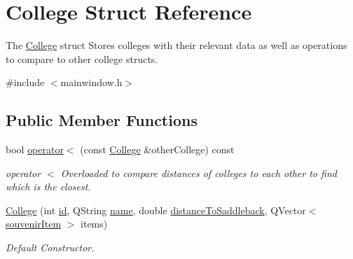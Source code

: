 \hypertarget{struct_college}{}\section{College Struct Reference}
\label{struct_college}


The \mbox{\hyperlink{struct_college}{College}} struct Stores colleges with their relevant data as well as operations to compare to other college structs.  




{\ttfamily \#include $<$mainwindow.\+h$>$}

\subsection*{Public Member Functions}
\begin{DoxyCompactItemize}
\item 
bool \mbox{\hyperlink{struct_college_a6cdcaec6e39c48a6f42f4e908aa04d95}{operator$<$}} (const \mbox{\hyperlink{struct_college}{College}} \&other\+College) const
\begin{DoxyCompactList}\small\item\em operator $<$ Overloaded to compare distances of colleges to each other to find which is the closest. \end{DoxyCompactList}\item 
\mbox{\hyperlink{struct_college_a99fcfec7020b9c21aa202a496397ec57}{College}} (int \mbox{\hyperlink{struct_college_ac843c7eba029693454852fddeaeeb9b4}{id}}, Q\+String \mbox{\hyperlink{struct_college_ae8b235251d87f2e0709e90a697b0d06b}{name}}, double \mbox{\hyperlink{struct_college_a173efd43af4e173b2a77ba1054d91374}{distance\+To\+Saddleback}}, Q\+Vector$<$ \mbox{\hyperlink{structsouvenir_item}{souvenir\+Item}} $>$ items)
\begin{DoxyCompactList}\small\item\em Default Constructor. \end{DoxyCompactList}\end{DoxyCompactItemize}

